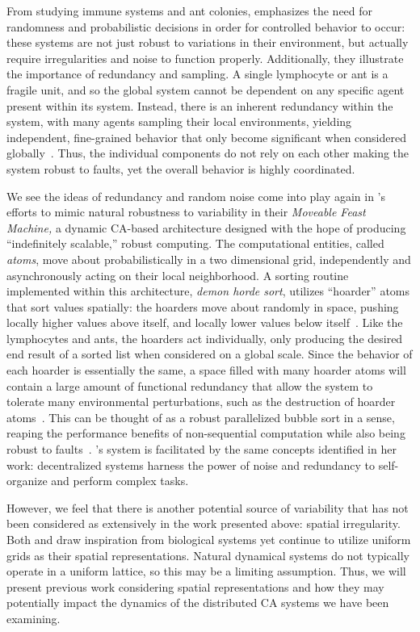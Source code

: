 \documentclass[a4paper,11pt]{report}
\begin{document}
From studying immune systems and ant colonies, \citeauthor{mi05} emphasizes the need for randomness and probabilistic decisions in order for controlled behavior to occur: these systems are not just robust to variations in their environment, but actually require irregularities and noise to function properly. Additionally, they illustrate the importance of redundancy and sampling. A single lymphocyte or ant is a fragile unit, and so the global system cannot be dependent on any specific agent present within its system. Instead, there is an inherent redundancy within the system, with many agents sampling their local environments, yielding independent, fine-grained behavior that only become significant when considered globally~\cite{mi05}. Thus, the individual components do not rely on each other making the system robust to faults, yet the overall behavior is highly coordinated. 

We see the ideas of redundancy and random noise come into play again in \citeauthor{ac14}'s efforts to mimic natural robustness to variability in their \textit{Moveable Feast Machine,} a dynamic CA-based architecture designed with the hope of producing ``indefinitely scalable,'' robust computing. The computational entities, called \textit{atoms}, move about probabilistically in a two dimensional grid, independently and asynchronously acting on their local neighborhood. A sorting routine implemented within this architecture, \textit{demon horde sort}, utilizes ``hoarder'' atoms that sort values spatially: the hoarders move about randomly in space, pushing locally higher values above itself, and locally lower values below itself~\cite{ac12}. Like the lymphocytes and ants, the hoarders act individually, only producing the desired end result of a sorted list when considered on a global scale. Since the behavior of each hoarder is essentially the same, a space filled with many hoarder atoms will contain a large amount of functional redundancy that allow the system to tolerate many environmental perturbations, such as the destruction of hoarder atoms~\cite{ac14}. This can be thought of as a robust parallelized bubble sort in a sense, reaping the performance benefits of non-sequential computation while also being robust to faults~\cite{ac13,ch89}. \citeauthor{ac14}'s system is facilitated by the same concepts \citeauthor{mi05} identified in her work: decentralized systems harness the power of noise and redundancy to self-organize and perform complex tasks.

However, we feel that there is another potential source of variability that has not been considered as extensively in the work presented above: spatial irregularity. Both \citeauthor{me07} and \citeauthor{ac14} draw inspiration from biological systems yet continue to utilize uniform grids as their spatial representations. Natural dynamical systems do not typically operate in a uniform lattice, so this may be a limiting assumption. Thus, we will present previous work considering spatial representations and how they may potentially impact the dynamics of the distributed CA systems we have been examining.
\end{document}
